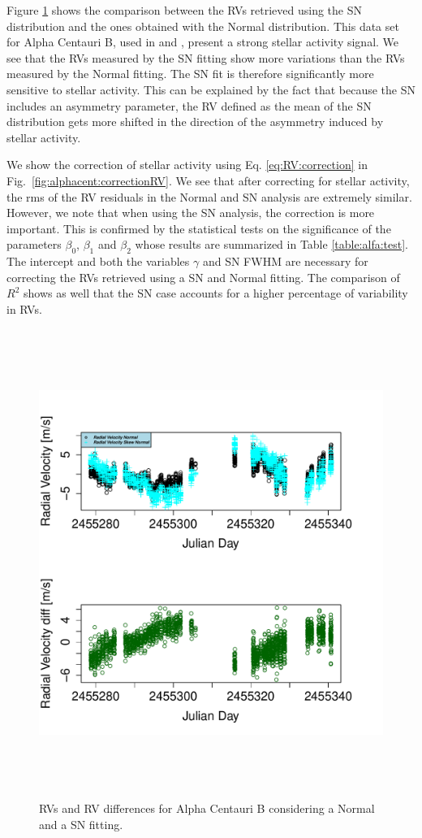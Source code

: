 \documentclass[11pt, oneside]{article}
\begin{document}
Figure \ref{fig:alphacent:diff:RV} shows the comparison between the RVs retrieved using the SN distribution and the ones obtained with the Normal distribution. This data set for Alpha Centauri B, used in \citet{Dumusque-2012} and \citet{Thompson-2017}, present a strong stellar activity signal. We see that the RVs measured by the SN fitting show more variations than the RVs measured by the Normal fitting. The SN fit is therefore significantly more sensitive to stellar activity. This can be explained by the fact that because the SN includes an asymmetry parameter, the RV defined as the mean of the SN distribution gets more shifted in the direction of the asymmetry induced by stellar activity.

We show the correction of stellar activity using Eq. \ref{eq:RV:correction} in Fig.~\ref{fig:alphacent:correctionRV}. We see that after correcting for stellar activity, the rms of the RV residuals in the Normal and SN analysis are extremely similar. However, we note that when using the SN analysis, the correction is more important. This is confirmed by the statistical tests on the significance of the parameters $\beta_{0}$, $\beta_{1}$ and $\beta_{2}$ whose results are summarized in Table \ref{table:alfa:test}. The intercept and both the variables $\gamma$ and SN FWHM are necessary for correcting the RVs retrieved using a SN and Normal fitting. The comparison of $R^2$ shows as well that the SN case accounts for a higher percentage of  variability in RVs. 

\begin{figure}[htbp]
   \centering
\includegraphics[height = 6in]{HD12862_[2]RadialVelocityDifferences.pdf} 
   \caption{RVs and RV differences for Alpha Centauri B considering a Normal and a SN fitting.}
   \label{fig:alphacent:diff:RV}
\end{figure}
\end{document}
